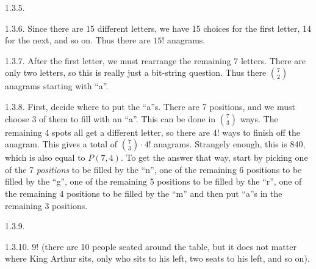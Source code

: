 \begin {itemize}
\begin{ans}{1.3.5.}
\end{ans}
\begin{ans}{1.3.6.}
		Since there are 15 different letters, we have 15 choices for the first letter, 14 for the next, and so on.  Thus there are $15!$ anagrams.
	
\end{ans}
\begin{ans}{1.3.7.}
	 After the first letter, we must rearrange the remaining 7 letters.  There are only two letters, so this is really just a bit-string question.  Thus there ${7 \choose 2}$ anagrams starting with ``a''.
	
\end{ans}
\begin{ans}{1.3.8.}
		First, decide where to put the ``a''s.  There are 7 positions, and we must choose 3 of them to fill with an ``a''.  This can be done in ${7 \choose 3}$ ways.  The remaining 4 spots all get a different letter, so there are $4!$ ways to finish off the anagram.  This gives a total of ${7 \choose 3}\cdot 4!$ anagrams.  Strangely enough, this is 840, which is also equal to $P(7,4)$.  To get the answer that way, start by picking one of the 7 \emph{positions} to be filled by the ``n'', one of the remaining 6 positions to be filled by the ``g'', one of the remaining 5 positions to be filled by the ``r'', one of the remaining 4 positions to be filled by the ``m'' and then put ``a''s in the remaining 3 positions.
	
\end{ans}
\begin{ans}{1.3.9.}
  
\end{ans}
\begin{ans}{1.3.10.}
     $9!$ (there are 10 people seated around the table, but it does not matter where King Arthur sits, only who sits to his left, two seats to his left, and so on).
  
\end{ans}
\protect \end {itemize}

